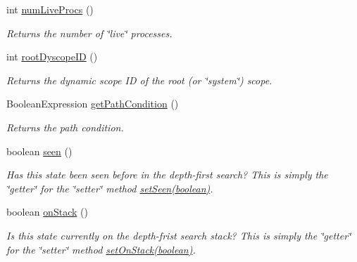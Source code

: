 \begin{DoxyCompactItemize}
int \hyperlink{classedu_1_1udel_1_1cis_1_1vsl_1_1civl_1_1state_1_1common_1_1immutable_1_1ImmutableMonoState_a83ae4073ef40082541e4c19659acec7c}{num\+Live\+Procs} ()
\begin{DoxyCompactList}\small\item\em Returns the number of \char`\"{}live\char`\"{} processes. \end{DoxyCompactList}\item 
int \hyperlink{classedu_1_1udel_1_1cis_1_1vsl_1_1civl_1_1state_1_1common_1_1immutable_1_1ImmutableMonoState_a6aa0f21ed28a283be51de9cdb47be459}{root\+Dyscope\+I\+D} ()
\begin{DoxyCompactList}\small\item\em Returns the dynamic scope I\+D of the root (or \char`\"{}system\char`\"{}) scope. \end{DoxyCompactList}\item 
Boolean\+Expression \hyperlink{classedu_1_1udel_1_1cis_1_1vsl_1_1civl_1_1state_1_1common_1_1immutable_1_1ImmutableMonoState_a16b5ff80c0c95322035f704203a58990}{get\+Path\+Condition} ()
\begin{DoxyCompactList}\small\item\em Returns the path condition. \end{DoxyCompactList}\item 
boolean \hyperlink{classedu_1_1udel_1_1cis_1_1vsl_1_1civl_1_1state_1_1common_1_1immutable_1_1ImmutableMonoState_a05fb152d9409bc3002beb5dda72d8063}{seen} ()
\begin{DoxyCompactList}\small\item\em Has this state been seen before in the depth-\/first search? This is simply the \char`\"{}getter\char`\"{} for the \char`\"{}setter\char`\"{} method \hyperlink{classedu_1_1udel_1_1cis_1_1vsl_1_1civl_1_1state_1_1common_1_1immutable_1_1ImmutableMonoState_af198e587242e465f4c7eb6e529424112}{set\+Seen(boolean)}. \end{DoxyCompactList}\item 
boolean \hyperlink{classedu_1_1udel_1_1cis_1_1vsl_1_1civl_1_1state_1_1common_1_1immutable_1_1ImmutableMonoState_a0c9ad662a923c041793cfe59156c73ac}{on\+Stack} ()
\begin{DoxyCompactList}\small\item\em Is this state currently on the depth-\/frist search stack? This is simply the \char`\"{}getter\char`\"{} for the \char`\"{}setter\char`\"{} method \hyperlink{classedu_1_1udel_1_1cis_1_1vsl_1_1civl_1_1state_1_1common_1_1immutable_1_1ImmutableMonoState_abcbd2d81aa0e7490632a3e47f267013e}{set\+On\+Stack(boolean)}. \end{DoxyCompactList}\item 

\end{DoxyCompactItemize}
